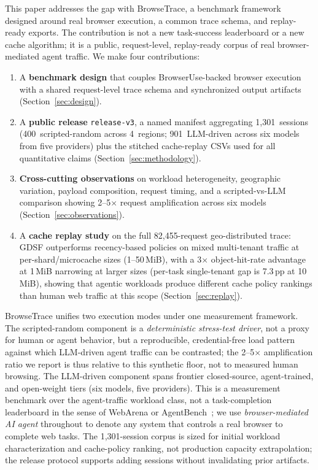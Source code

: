 \documentclass[10pt,sigconf,letterpaper,anonymous,nonacm]{acmart}
\newcommand{\sysname}{Browse\-Trace\xspace}
\newcommand{\release}{\texttt{release-v3}\xspace}
\begin{document}
This paper addresses the gap with \sysname, a benchmark framework
designed around real browser execution, a common trace schema, and
replay-ready exports.  The contribution is not a new task-success
leaderboard or a new cache algorithm; it is a public, request-level,
replay-ready corpus of real browser-mediated agent traffic.  We make
four contributions:

\begin{enumerate}
\item A \textbf{benchmark design} that couples
  Browser\-Use-backed browser execution with a shared
  request-level trace schema and synchronized output artifacts
  (Section~\ref{sec:design}).

\item A \textbf{public release} \release, a named manifest aggregating
  1{,}301~sessions (400~scripted-random across 4~regions; 901~LLM-driven
  across six models from five providers) plus the stitched cache-replay
  CSVs used for all quantitative claims (Section~\ref{sec:methodology}).

\item \textbf{Cross-cutting observations} on workload heterogeneity,
  geographic variation, payload composition, request timing, and
  a scripted-vs-LLM comparison showing 2--5$\times$ request
  amplification across six models
  (Section~\ref{sec:observations}).

\item A \textbf{cache replay study} on the full 82{,}455-request
  geo-distributed trace: GDSF outperforms recency-based policies on
  mixed multi-tenant traffic at per-shard/microcache sizes
  (1--50\,MiB), with a 3$\times$ object-hit-rate advantage at 1\,MiB
  narrowing at larger sizes (per-task single-tenant gap is 7.3\,pp at
  10\,MiB), showing that agentic workloads produce different cache
  policy rankings than human web traffic at this scope (Section~\ref{sec:replay}).
\end{enumerate}

\sysname unifies two execution modes under one measurement framework.
The scripted-random component is a \emph{deterministic stress-test
driver}, not a proxy for human or agent behavior, but a reproducible,
credential-free load pattern against which LLM-driven agent traffic
can be contrasted; the 2--5$\times$ amplification ratio we report is
thus relative to this synthetic floor, not to measured human browsing.  The LLM-driven component spans frontier
closed-source, agent-trained, and open-weight tiers (six models, five
providers).  This is a measurement benchmark over the agent-traffic
workload class, not a task-completion leaderboard in the sense of
WebArena or AgentBench~\cite{webarena,agentbench}; we use
\emph{browser-mediated AI agent} throughout to denote any system that
controls a real browser to complete web tasks.  The 1{,}301-session
corpus is sized for initial workload characterization and cache-policy
ranking, not production capacity extrapolation; the release protocol
supports adding sessions without invalidating prior artifacts.
\end{document}
